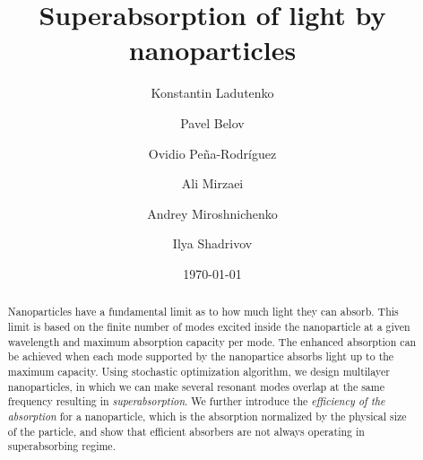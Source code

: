 \documentclass[aps,prl,twocolumn,showpacs,superscriptaddress,groupedaddress]{revtex4-1}
\begin{document}

\title{Superabsorption of light by nanoparticles} %

\author{Konstantin Ladutenko} 


\author{Pavel Belov} 

\author{Ovidio Pe\~{n}a-Rodr\'{i}guez} 

\author{Ali Mirzaei} \author{Andrey Miroshnichenko} \author{Ilya
  Shadrivov} 

\date{\today}

\begin{abstract}
  Nanoparticles have a fundamental limit as to how much light they can
  absorb. This limit is based on the finite number of modes excited
  inside the nanoparticle at a given wavelength and maximum absorption
  capacity per mode. The enhanced absorption can be achieved when each
  mode supported by the nanopartice absorbs light up to the maximum
  capacity. Using stochastic optimization algorithm, we design
  multilayer nanoparticles, in which we can make several resonant
  modes overlap at the same frequency resulting in {\it
    superabsorption}.  We further introduce the {\it efficiency of the
    absorption} for a nanoparticle, which is the absorption normalized
  by the physical size of the particle, and show that efficient
  absorbers are not always operating in superabsorbing regime.
\end{abstract}
\end{document}

